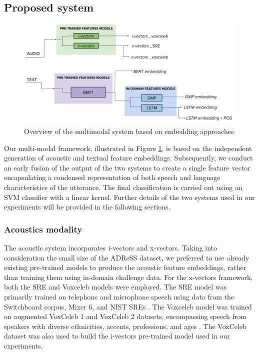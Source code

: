 \subsection{Proposed system}
\begin{figure}
  \begin{center}
  \includegraphics[scale=0.35]{imgs/ADReSS.png}  
  \caption{Overview of the multimodal system based on embedding approaches}
  \label{fig:adress_overview}
  \end{center}
\end{figure}
Our multi-modal framework, illustrated in Figure \ref{fig:adress_overview}, is based on the independent generation of acoustic and textual feature embeddings. Subsequently, we conduct an early fusion of the output of the two systems to create a single feature vector encapsulating a condensed representation of both speech and language characteristics of the utterance. The final classification is carried out using an \ac{SVM} classifier with a linear kernel. Further details of the two systems used in our experiments will be provided in the following sections.
\subsubsection{Acoustics modality}
The acoustic system incorporates i-vectors and x-vectors. Taking into consideration the small size of the ADReSS dataset, we preferred to use already existing pre-trained models to produce the acoustic feature embeddings, rather than training them using in-domain challenge data. For the x-vectors framework, both the SRE and Voxceleb models were employed. The SRE model was primarily trained on telephone and microphone speech using data from the Switchboard corpus, Mixer 6, and NIST SREs \cite{snyder2018x}. The Voxceleb model was trained on augmented VoxCeleb 1 and VoxCeleb 2 datasets, encompassing speech from speakers with diverse ethnicities, accents, professions, and ages \cite{snyder2018x,nagrani17_interspeech}. The VoxCeleb dataset was also used to build the i-vectors pre-trained model used in our experiments.

